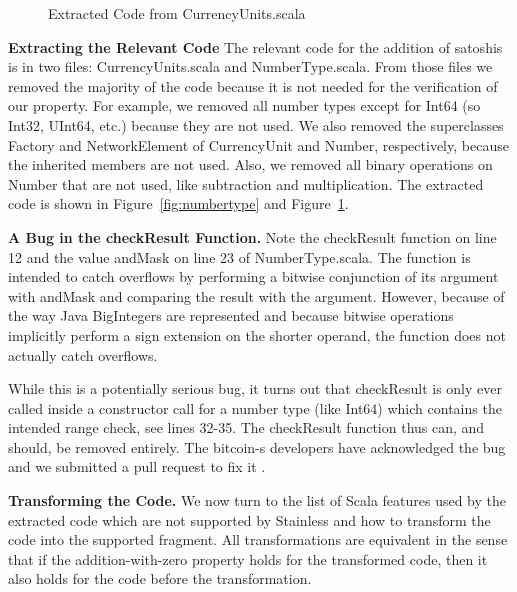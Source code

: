 \documentclass[runningheads]{llncs}
\renewcommand{\paragraph}{\textbf}%
\begin{document}
\begin{figure}

  \caption{Extracted Code from CurrencyUnits.scala}
  \label{fig:currencyunits}
\end{figure}

\paragraph{Extracting the Relevant Code} The relevant code for the
addition of satoshis is in two files: CurrencyUnits.scala and
NumberType.scala. From those files we removed the majority of the code
because it is not needed for the verification of our property.  For
example, we removed all number types except for Int64 (so Int32,
UInt64, etc.) because they are not used. We also removed the
superclasses Factory and NetworkElement of CurrencyUnit and Number,
respectively, because the inherited members are not used. Also, we
removed all binary operations on Number that are not used, like
subtraction and multiplication. The extracted code is shown in
Figure~\ref{fig:numbertype} and Figure~\ref{fig:currencyunits}.

\paragraph{A Bug in the checkResult Function.} Note the checkResult
function on line 12 and the value andMask on line 23 of
NumberType.scala. The function is intended to catch overflows by
performing a bitwise conjunction of its argument with andMask and
comparing the result with the argument. However, because of the way
Java BigIntegers are represented \cite{wikipedia:twocomp} and because
bitwise operations implicitly perform a sign extension
\cite{java:bigint} on the shorter operand, the function does not
actually catch overflows.

While this is a potentially serious bug, it turns out that checkResult
is only ever called inside a constructor call for a number type (like
Int64) which contains the intended range check, see lines 32-35. The
checkResult function thus can, and should, be removed entirely. The
bitcoin-s developers have acknowledged the bug and we submitted a pull
request to fix it \cite{BitcoinS:pull565}.


\paragraph{Transforming the Code.} We now turn to the list of Scala
features used by the extracted code which are not supported by
Stainless and how to transform the code into the supported fragment.
All transformations are equivalent in the sense that if the
addition-with-zero property holds for the transformed code, then it
also holds for the code before the transformation.
\end{document}
